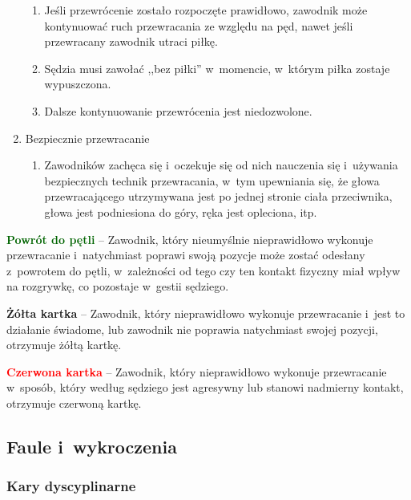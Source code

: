 \documentclass[12pt,a4paper]{article}
\newcommand\redcard[1]{\bgroup\textcolor{red}{\textbf{#1}}}
\newcommand\yellowcard[1]{\bgroup\textcolor{darkyellow}{\textbf{#1}}}
\newcommand\other[1]{\bgroup\textcolor{darkgreen}{\textbf{#1}}}
\begin{document}
\begin{enumerate}
	      \begin{enumerate}
		      \item
		            Jeśli przewrócenie zostało rozpoczęte prawidłowo, zawodnik może
		            kontynuować ruch przewracania ze względu na pęd, nawet jeśli
		            przewracany zawodnik utraci piłkę.
		      \item
		            Sędzia musi zawołać ,,bez piłki'' w~momencie, w~którym piłka
		            zostaje wypuszczona.
		      \item
		            Dalsze kontynuowanie przewrócenia jest niedozwolone.
	      \end{enumerate}
	\item
	      Bezpiecznie przewracanie

	      \begin{enumerate}
		      \item
		            Zawodników zachęca się i~oczekuje się od nich nauczenia się i~używania bezpiecznych technik przewracania, w~tym upewniania się, że
		            głowa przewracającego utrzymywana jest po jednej stronie ciała przeciwnika,
		            głowa jest podniesiona do góry, ręka jest opleciona, itp.
	      \end{enumerate}
\end{enumerate}

\other{Powrót do pętli} -- Zawodnik, który nieumyślnie nieprawidłowo
wykonuje przewracanie i~natychmiast poprawi swoją pozycje może zostać
odesłany z~powrotem do pętli, w~zależności od tego czy ten kontakt
fizyczny miał wpływ na rozgrywkę, co pozostaje w~gestii sędziego.

\yellowcard{Żółta kartka} -- Zawodnik, który nieprawidłowo wykonuje
przewracanie i~jest to działanie świadome, lub zawodnik nie poprawia
natychmiast swojej pozycji, otrzymuje żółtą kartkę.

\redcard{Czerwona kartka} -- Zawodnik, który nieprawidłowo wykonuje
przewracanie w~sposób, który według sędziego jest agresywny lub stanowi
nadmierny kontakt, otrzymuje czerwoną kartkę.

\subsection{Faule i~wykroczenia}

\subsubsection{Kary dyscyplinarne}
\end{document}
